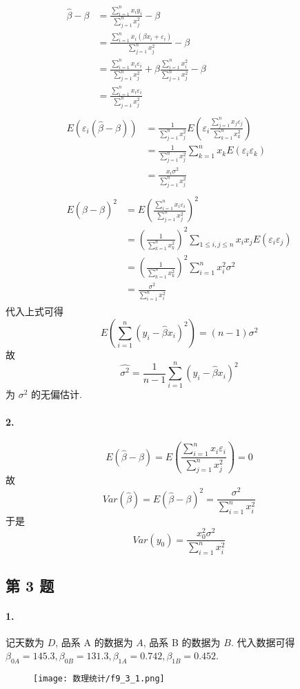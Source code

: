 \documentclass[../main.tex]{subfiles}
\begin{document}
\begin{gather*}
    \begin{aligned}
        \widehat{\beta} - \beta
        &= \frac{\sum_{i = 1}^{n} x_i y_i}{\sum_{j = 1}^{n} x_j^2} - \beta \\
        &= \frac{\sum_{i = 1}^{n} x_i \left( \beta x_i + \varepsilon_i \right)}{\sum_{j = 1}^{n} x_j^2} - \beta \\
        &= \frac{\sum_{i = 1}^{n} x_i \varepsilon_i}{\sum_{j = 1}^{n} x_j^2} + \beta \frac{\sum_{i = 1}^{n} x_i^2}{\sum_{j = 1}^{n}x_j^2} - \beta \\
        &= \frac{\sum_{i = 1}^{n} x_i \varepsilon_i}{\sum_{j = 1}^{n} x_j^2}
    \end{aligned} \\
    \begin{aligned}
        E (\varepsilon_i (\widehat{\beta} - \beta))
        &= \frac{1}{\sum_{j = 1}^{n} x_j^2} E \left( \varepsilon_i \frac{\sum_{j = 1}^{n} x_j \varepsilon_j}{\sum_{k = 1}^{n} x_k^2} \right) \\
        &= \frac{1}{\sum_{j = 1}^{n} x_j^2} \sum_{k = 1}^{n} x_k E \left( \varepsilon_i \varepsilon_k \right) \\
        &= \frac{x_i \sigma^2}{\sum_{j = 1}^{n} x_j^2}
    \end{aligned} \\
    \begin{aligned}
        E (\widehat{\beta} - \beta)^2
        &= E \left( \frac{\sum_{i = 1}^{n} x_i \varepsilon_i}{\sum_{j = 1}^{n} x_j^2} \right)^2 \\
        &= \left( \frac{1}{\sum_{k = 1}^{n} x_k^2} \right)^2 \sum_{1 \leqslant i, j \leqslant n} x_i x_j E \left( \varepsilon_i \varepsilon_j \right) \\
        &= \left( \frac{1}{\sum_{k = 1}^{n} x_k^2} \right)^2 \sum_{i = 1}^{n} x_i^2 \sigma^2 \\
        &= \frac{\sigma^2}{\sum_{i = 1}^{n} x_i^2}
    \end{aligned}
\end{gather*}
代入上式可得
\[
    E \left( \sum_{i = 1}^{n} ( y_i - \widehat{\beta} x_i )^2 \right)
    =
    \left( n - 1 \right) \sigma^2
\]
故
\[
    \widehat{\sigma^2} = \frac{1}{n - 1} \sum_{i = 1}^{n} (y_i - \widehat{\beta} x_i)^2
\]
为 $\sigma^2$ 的无偏估计.

\noindent\paragraph*{2.}
\[
    E (\widehat{\beta} - \beta)
    = E \left( \frac{\sum_{i = 1}^{n} x_i \varepsilon_i}{\sum_{j = 1}^{n} x_j^2} \right)
    = 0
\]
故
\[
    Var (\widehat{\beta})
    = E (\widehat{\beta} - \beta)^2
    = \frac{\sigma^2}{\sum_{i = 1}^{n} x_i^2}
\]
于是
\[
    Var \left( y_0 \right)
    = \frac{x_0^2 \sigma^2}{\sum_{i = 1}^{n} x_i^2}
\]

\subsection{第 3 题}
\noindent\paragraph*{1.}
记天数为 $D$, 品系 A 的数据为 $A$, 品系 B 的数据为 $B$.
代入数据可得 $\beta_{0A} = 145.3, \beta_{0B} = 131.3, \beta_{1A} = 0.742, \beta_{1B} = 0.452$.
\begin{figure}[htpb]
    \centering
    \texttt{[image: 数理统计/f9\_3\_1.png]}
\end{figure}
\end{document}
